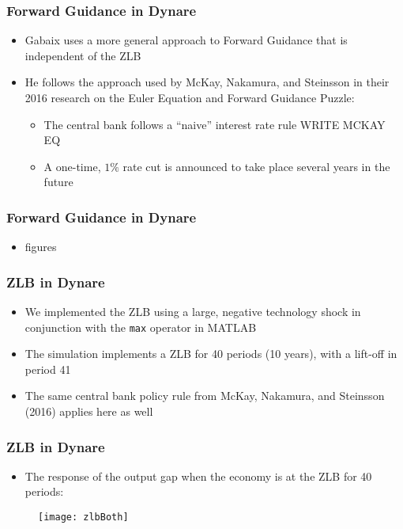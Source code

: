 \documentclass{beamer}
\begin{document}
\begin{frame}
	\frametitle{Forward Guidance in Dynare}
	\begin{itemize}
		\item Gabaix uses a more general approach to Forward Guidance that is independent of the ZLB
		\vspace{8pt}
		\item He follows the approach used by McKay, Nakamura, and Steinsson in their 2016 research on the Euler Equation and Forward Guidance Puzzle:
		\vspace{8pt}
		\begin{itemize}
			\item The central bank follows a ``naive'' interest rate rule WRITE MCKAY EQ
			\item A one-time, $1\%$ rate cut is announced to take place several years in the future
		\end{itemize}
	\end{itemize}
\end{frame}


\begin{frame}
	\frametitle{Forward Guidance in Dynare}
	\begin{itemize}
		\item figures
	\end{itemize}
\end{frame}


\begin{frame}
	\frametitle{ZLB in Dynare}
	\begin{itemize}
		\item We implemented the ZLB using a large, negative technology shock in conjunction with the \texttt{max} operator in MATLAB
		\vspace{8pt}
		\item The simulation implements a ZLB for 40 periods (10 years), with a lift-off in period 41
		\vspace{8pt}
		\item The same central bank policy rule from McKay, Nakamura, and Steinsson (2016) applies here as well
	\end{itemize}
\end{frame}


\begin{frame}
	\frametitle{ZLB in Dynare}
	\begin{itemize}
		\item The response of the output gap when the economy is at the ZLB for 40 periods:
	\end{itemize}
	\begin{figure}[h]
		\texttt{[image: zlbBoth]}
	\end{figure}	
\end{frame}
\end{document}
